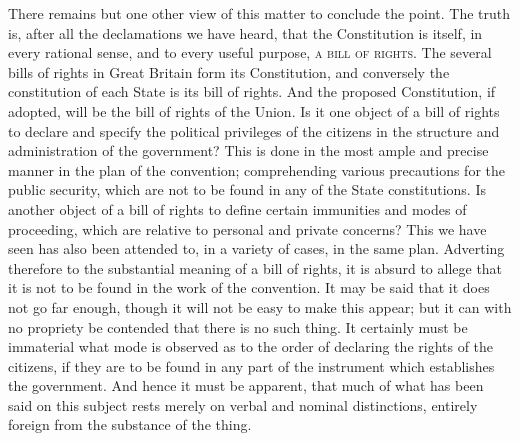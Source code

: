 There remains but one other view of this matter to conclude the point. The truth is, after all the declamations we have heard, that the Constitution is itself, in every rational sense, and to every useful purpose, \textsc{a bill of rights}. The several bills of rights in Great Britain form its Constitution, and conversely the constitution of each State is its bill of rights. And the proposed Constitution, if adopted, will be the bill of rights of the Union. Is it one object of a bill of rights to declare and specify the political privileges of the citizens in the structure and administration of the government? This is done in the most ample and precise manner in the plan of the convention; comprehending various precautions for the public security, which are not to be found in any of the State constitutions. Is another object of a bill of rights to define certain immunities and modes of proceeding, which are relative to personal and private concerns? This we have seen has also been attended to, in a variety of cases, in the same plan. Adverting therefore to the substantial meaning of a bill of rights, it is absurd to allege that it is not to be found in the work of the convention. It may be said that it does not go far enough, though it will not be easy to make this appear; but it can with no propriety be contended that there is no such thing. It certainly must be immaterial what mode is observed as to the order of declaring the rights of the citizens, if they are to be found in any part of the instrument which establishes the government. And hence it must be apparent, that much of what has been said on this subject rests merely on verbal and nominal distinctions, entirely foreign from the substance of the thing.


